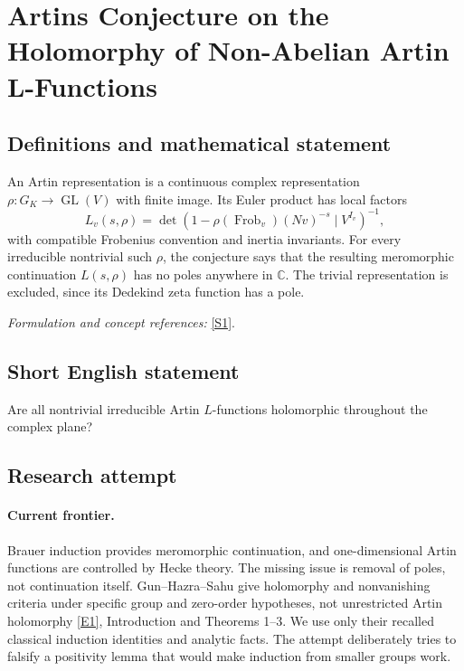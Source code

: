 \documentclass[11pt,a4paper]{article}
\newcommand{\C}{\mathbb{C}}
\newcommand{\sref}[2]{\hyperlink{source:#1:#2}{[S#2]}}
\newcommand{\eref}[2]{\hyperlink{extra:#1:#2}{[E#2]}}
\newif\ifshowcatalogue
\newcommand{\cataloguescope}[1]{\ifshowcatalogue
 \paragraph{Exact scope in the supplied catalogue.}
 \begin{quote}\small #1\end{quote}\fi}
\numberwithin{equation}{section}
\begin{document}
\setcounter{section}{65}
\clearpage
\section{\texorpdfstring{Artins Conjecture on the Holomorphy of Non-Abelian Artin L-Functions}{Artins Conjecture on the Holomorphy of Non-Abelian Artin L-Functions}}\label{66}
\subsection{Definitions and mathematical statement}
An Artin representation is a continuous complex representation $\rho:G_K\to\operatorname{GL}(V)$ with finite image. Its Euler product has local factors
\[
 L_v(s,\rho)=\det(1-\rho(\operatorname{Frob}_v)(Nv)^{-s}\mid V^{I_v})^{-1},
\]
with compatible Frobenius convention and inertia invariants. For every irreducible nontrivial such $\rho$, the conjecture says that the resulting meromorphic continuation $L(s,\rho)$ has no poles anywhere in $\C$. The trivial representation is excluded, since its Dedekind zeta function has a pole.
\par\smallskip\textit{Formulation and concept references:} \sref{66}{1}.
\cataloguescope{Prove that every non-trivial irreducible Artin L-function L(s, rho) associated to a Galois representation rho is an entire holomorphic function on the whole complex plane.}
\subsection{Short English statement}
Are all nontrivial irreducible Artin $L$-functions holomorphic throughout the complex plane?
\subsection{Research attempt}

\paragraph{Current frontier.}
Brauer induction provides meromorphic continuation, and one-dimensional Artin functions are controlled by Hecke theory. The missing issue is removal of poles, not continuation itself. Gun--Hazra--Sahu give holomorphy and nonvanishing criteria under specific group and zero-order hypotheses, not unrestricted Artin holomorphy \eref{66}{1}, Introduction and Theorems 1--3. We use only their recalled classical induction identities and analytic facts. The attempt deliberately tries to falsify a positivity lemma that would make induction from smaller groups work.
\end{document}
